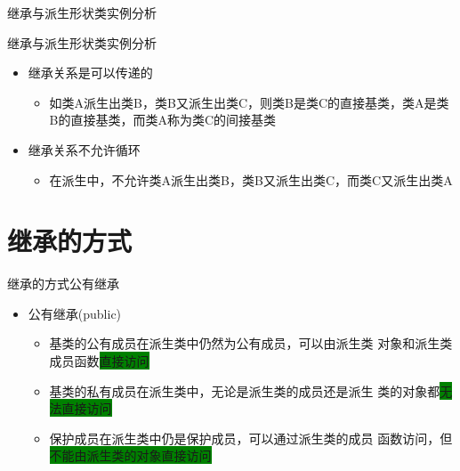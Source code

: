 \begin{frame}[t, fragile]{继承与派生}{形状类实例分析}
\begin{center}
  \end{center}
\end{frame}

\begin{frame}[t, fragile]{继承与派生}{形状类实例分析}%
  \stretchon
  \begin{itemize}
  \item 继承关系是可以传递的
    \begin{itemize}
    \item 如类A派生出类B，类B又派生出类C，则类B是类C的直接基类，类A是类B的直接基类，而\alert{类A称为类C的间接基类}
    \end{itemize}
  \item 继承关系不允许循环
    \begin{itemize}
    \item 在派生中，\alert{不允许}类A派生出类B，类B又派生出类C，而类C又派生出类A
    \end{itemize}
  \end{itemize}
  \stretchoff
\end{frame}

\section[方式]{继承的方式}\label{sec:chap05-sec02}
\begin{frame}[t, fragile]{继承的方式}{公有继承}%
  \stretchon
  \begin{itemize}
  \item 公有继承(public)
    \begin{itemize}
    \item 基类的\alert{公有成员}在派生类中仍然为公有成员，可以由派生类
      对象和派生类成员函数\colorbox{green}{直接访问}
    \item 基类的\alert{私有成员}在派生类中，无论是派生类的成员还是派生
      类的对象都\colorbox{green}{无法直接访问}
    \item \alert{保护成员}在派生类中仍是保护成员，可以通过派生类的成员
      函数访问，但\colorbox{green}{不能由派生类的对象直接访问}
    \end{itemize}
  \end{itemize}
  \stretchoff
\end{frame}

